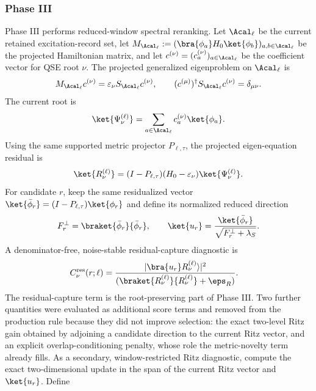 \subsubsection{Phase III}
\label{sec:phase3}

Phase III performs reduced-window spectral reranking.  Let $\Acal_\ell$ be the current retained excitation-record set, let
$M_{\Acal_\ell}:=(\bra{\phi_a}H_0\ket{\phi_b})_{a,b\in\Acal_\ell}$ be the projected Hamiltonian matrix, and let $c^{(\nu)}=(c_a^{(\nu)})_{a\in\Acal_\ell}$ be the coefficient vector for QSE root $\nu$.  The projected generalized eigenproblem on $\Acal_\ell$ is
\begin{equation}
M_{\Acal_\ell}c^{(\nu)}=\varepsilon_\nu S_{\Acal_\ell}c^{(\nu)},
\qquad
(c^{(\mu)})^\dagger S_{\Acal_\ell}c^{(\nu)}=\delta_{\mu\nu}.
\label{eq:qse_phase3_gep}
\end{equation}
The current root is
\begin{equation}
\ket{\Psi_\nu^{(\ell)}}=
\sum_{a\in\Acal_\ell}c_a^{(\nu)}\ket{\phi_a}.
\label{eq:qse_current_root}
\end{equation}
Using the same supported metric projector $P_{\ell,\tau}$, the projected eigen-equation residual is
\begin{equation}
\ket{R_\nu^{(\ell)}}=
(I-P_{\ell,\tau})(H_0-\varepsilon_\nu)\ket{\Psi_\nu^{(\ell)}}.
\label{eq:qse_eigen_residual}
\end{equation}
For candidate $r$, keep the same residualized vector $\ket{\bar\phi_r}=(I-P_{\ell,\tau})\ket{\phi_r}$ and define its normalized reduced direction
\begin{equation}
F_r^\perp=\braket{\bar\phi_r}{\bar\phi_r},
\qquad
\ket{u_r}=\frac{\ket{\bar\phi_r}}{\sqrt{F_r^\perp+\lambda_S}}.
\label{eq:qse_reduced_candidate_direction}
\end{equation}
A denominator-free, noise-stable residual-capture diagnostic is
\begin{equation}
\begin{aligned}
C_\nu^{\rm res}(r;\ell)
&=
\frac{
|\bra{u_r}R_\nu^{(\ell)}\rangle|^2
}{
(\braket{R_\nu^{(\ell)}}{R_\nu^{(\ell)}}+\eps_R)
}.
\end{aligned}
\label{eq:qse_residual_capture}
\end{equation}
The residual-capture term is the root-preserving part of Phase III.  Two further quantities were evaluated as additional score terms and removed from the production rule because they did not improve selection: the exact two-level Ritz gain obtained by adjoining a candidate direction to the current Ritz vector, and an explicit overlap-conditioning penalty, whose role the metric-novelty term already fills.  As a secondary, window-restricted Ritz diagnostic, compute the exact two-dimensional update in the span of the current Ritz vector and \(\ket{u_r}\).  Define
